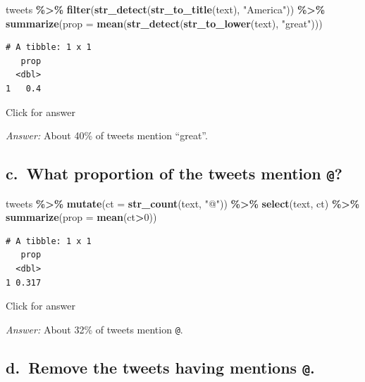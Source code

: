 \documentclass[
]{book}
\newenvironment{Shaded}{\begin{snugshade}}{\end{snugshade}}
\newcommand{\AttributeTok}[1]{\textcolor[rgb]{0.13,0.29,0.53}{#1}}
\newcommand{\DecValTok}[1]{\textcolor[rgb]{0.00,0.00,0.81}{#1}}
\newcommand{\FunctionTok}[1]{\textcolor[rgb]{0.13,0.29,0.53}{\textbf{#1}}}
\newcommand{\NormalTok}[1]{#1}
\newcommand{\SpecialCharTok}[1]{\textcolor[rgb]{0.81,0.36,0.00}{\textbf{#1}}}
\newcommand{\StringTok}[1]{\textcolor[rgb]{0.31,0.60,0.02}{#1}}
\begin{document}
\begin{Shaded}
\begin{Highlighting}[]
\NormalTok{tweets }\SpecialCharTok{\%\textgreater{}\%} \FunctionTok{filter}\NormalTok{(}\FunctionTok{str\_detect}\NormalTok{(}\FunctionTok{str\_to\_title}\NormalTok{(text), }\StringTok{"America"}\NormalTok{)) }\SpecialCharTok{\%\textgreater{}\%}
  \FunctionTok{summarize}\NormalTok{(}\AttributeTok{prop =} \FunctionTok{mean}\NormalTok{(}\FunctionTok{str\_detect}\NormalTok{(}\FunctionTok{str\_to\_lower}\NormalTok{(text), }\StringTok{"great"}\NormalTok{))) }
\end{Highlighting}
\end{Shaded}

\begin{verbatim}
# A tibble: 1 x 1
   prop
  <dbl>
1   0.4
\end{verbatim}

Click for answer

\emph{Answer:} About 40\% of tweets mention ``great''.

\hypertarget{c.-what-proportion-of-the-tweets-mention}{%
\subsection{\texorpdfstring{c.~What proportion of the tweets mention \texttt{@}?}{c.~What proportion of the tweets mention @?}}\label{c.-what-proportion-of-the-tweets-mention}}

\begin{Shaded}
\begin{Highlighting}[]
\NormalTok{tweets }\SpecialCharTok{\%\textgreater{}\%} \FunctionTok{mutate}\NormalTok{(}\AttributeTok{ct =} \FunctionTok{str\_count}\NormalTok{(text, }\StringTok{"@"}\NormalTok{)) }\SpecialCharTok{\%\textgreater{}\%}
  \FunctionTok{select}\NormalTok{(text, ct) }\SpecialCharTok{\%\textgreater{}\%}
  \FunctionTok{summarize}\NormalTok{(}\AttributeTok{prop =} \FunctionTok{mean}\NormalTok{(ct}\SpecialCharTok{\textgreater{}}\DecValTok{0}\NormalTok{))}
\end{Highlighting}
\end{Shaded}

\begin{verbatim}
# A tibble: 1 x 1
   prop
  <dbl>
1 0.317
\end{verbatim}

Click for answer

\emph{Answer:} About 32\% of tweets mention \texttt{@}.

\hypertarget{d.-remove-the-tweets-having-mentions-.}{%
\subsection{\texorpdfstring{d.~Remove the tweets having mentions \texttt{@}.}{d.~Remove the tweets having mentions @.}}\label{d.-remove-the-tweets-having-mentions-.}}
\end{document}
